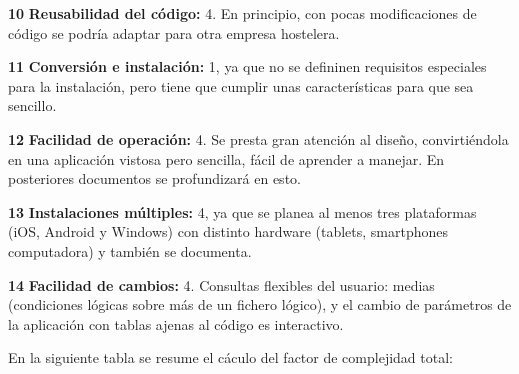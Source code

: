 \documentclass[spanish,a4paper,11pt, twoside]{report}	%
\begin{document}
	\vspace{0.15cm}
 
	\textbf{10} \textbf{Reusabilidad del código:} 4. En principio, con pocas modificaciones de código se podría adaptar para otra empresa hostelera.
	
	\vspace{0.15cm}
 
	\textbf{11} \textbf{Conversión e instalación:} 1, ya que no se defininen requisitos especiales para la instalación, pero tiene que cumplir unas características para que sea sencillo.
	
	\vspace{0.15cm}
 
	\textbf{12} \textbf{Facilidad de operación:} 4. Se presta gran atención al diseño, convirtiéndola en una aplicación vistosa pero sencilla, fácil de aprender a manejar. En posteriores documentos se profundizará en esto. 
	
	\vspace{0.15cm}
 
	\textbf{13} \textbf{Instalaciones múltiples:} 4, ya que se planea al menos tres plataformas (iOS, Android y Windows) con distinto hardware (tablets, smartphones  computadora) y también se documenta.
	
	\vspace{0.15cm}
 
	\textbf{14} \textbf{Facilidad de cambios:} 4. Consultas flexibles del usuario: medias (condiciones lógicas sobre más de un fichero lógico), y el cambio de parámetros de la aplicación con tablas ajenas al código es interactivo.


\vspace{0.35cm}

	En la siguiente tabla se resume el cáculo del factor de complejidad total:

\vspace{0.35cm}
\end{document}
